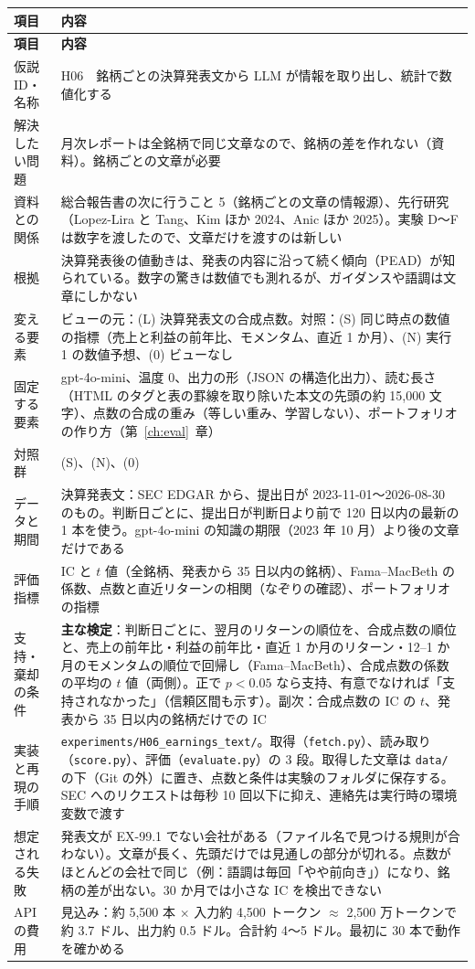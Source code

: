 \documentclass[xelatex,ja=standard,jafont=haranoaji,a4paper,10pt,openany]{bxjsreport}
\newcommand{\code}[1]{\texttt{#1}}
\newcommand{\chapref}[1]{第~\ref{#1}~章}
\newenvironment{plan}{\small\begin{longtable}{p{3.3cm}p{11.6cm}}\toprule\textbf{項目} & \textbf{内容} \\\midrule\endfirsthead
\toprule\textbf{項目} & \textbf{内容} \\\midrule\endhead\bottomrule\endfoot}{\end{longtable}}
\begin{document}
\begin{plan}
仮説 ID・名称 & H06　銘柄ごとの決算発表文から LLM が情報を取り出し、統計で数値化する \\
解決したい問題 & 月次レポートは全銘柄で同じ文章なので、銘柄の差を作れない（資料）。銘柄ごとの文章が必要 \\
資料との関係 & 総合報告書の次に行うこと 5（銘柄ごとの文章の情報源）、先行研究（Lopez-Lira と Tang、Kim ほか 2024、Anic ほか 2025）。実験 D〜F は数字を渡したので、文章だけを渡すのは新しい \\
根拠 & 決算発表後の値動きは、発表の内容に沿って続く傾向（PEAD）が知られている。数字の驚きは数値でも測れるが、ガイダンスや語調は文章にしかない \\
変える要素 & ビューの元：(L) 決算発表文の合成点数。対照：(S) 同じ時点の数値の指標（売上と利益の前年比、モメンタム、直近 1 か月）、(N) 実行 1 の数値予想、(0) ビューなし \\
固定する要素 & gpt-4o-mini、温度 0、出力の形（JSON の構造化出力）、読む長さ（HTML のタグと表の罫線を取り除いた本文の先頭の約 15,000 文字）、点数の合成の重み（等しい重み、学習しない）、ポートフォリオの作り方（\chapref{ch:eval}） \\
対照群 & (S)、(N)、(0) \\
データと期間 & 決算発表文：SEC EDGAR から、提出日が 2023-11-01〜2026-08-30 のもの。判断日ごとに、提出日が判断日より前で 120 日以内の最新の 1 本を使う。gpt-4o-mini の知識の期限（2023 年 10 月）より後の文章だけである \\
評価指標 & IC と $t$ 値（全銘柄、発表から 35 日以内の銘柄）、Fama--MacBeth の係数、点数と直近リターンの相関（なぞりの確認）、ポートフォリオの指標 \\
支持・棄却の条件 & \textbf{主な検定}：判断日ごとに、翌月のリターンの順位を、合成点数の順位と、売上の前年比・利益の前年比・直近 1 か月のリターン・12--1 か月のモメンタムの順位で回帰し（Fama--MacBeth）、合成点数の係数の平均の $t$ 値（両側）。正で $p<0.05$ なら支持、有意でなければ「支持されなかった」（信頼区間も示す）。副次：合成点数の IC の $t$、発表から 35 日以内の銘柄だけでの IC \\
実装と再現の手順 & \code{experiments/H06\_earnings\_text/}。取得（\code{fetch.py}）、読み取り（\code{score.py}）、評価（\code{evaluate.py}）の 3 段。取得した文章は \code{data/} の下（Git の外）に置き、点数と条件は実験のフォルダに保存する。SEC へのリクエストは毎秒 10 回以下に抑え、連絡先は実行時の環境変数で渡す \\
想定される失敗 & 発表文が EX-99.1 でない会社がある（ファイル名で見つける規則が合わない）。文章が長く、先頭だけでは見通しの部分が切れる。点数がほとんどの会社で同じ（例：語調は毎回「やや前向き」）になり、銘柄の差が出ない。30 か月では小さな IC を検出できない \\
API の費用 & 見込み：約 5,500 本 $\times$ 入力約 4,500 トークン $\approx$ 2,500 万トークンで約 3.7 ドル、出力約 0.5 ドル。合計約 4〜5 ドル。最初に 30 本で動作を確かめる \\
\end{plan}
\end{document}
